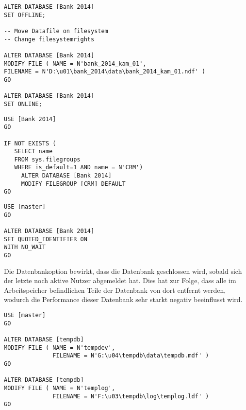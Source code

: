 \begin{enumerate}
\begin{lstlisting}[language=ms_sql, caption={Verschieben einer
      Datendatei}, label=admin_03_loesung_12]
ALTER DATABASE [Bank 2014]
SET OFFLINE;

-- Move Datafile on filesystem
-- Change filesystemrights

ALTER DATABASE [Bank 2014]
MODIFY FILE ( NAME = N'bank_2014_kam_01',
FILENAME = N'D:\u01\bank_2014\data\bank_2014_kam_01.ndf' )
GO

ALTER DATABASE [Bank 2014]
SET ONLINE;     
      \end{lstlisting}

      
      \begin{lstlisting}[language=ms_sql, caption={Ändern der
      Standarddateigruppe}, label=admin_03_loesung_12]
USE [Bank 2014]
GO

IF NOT EXISTS (
   SELECT name 
   FROM sys.filegroups 
   WHERE is_default=1 AND name = N'CRM')
     ALTER DATABASE [Bank 2014]
     MODIFY FILEGROUP [CRM] DEFAULT
GO
      \end{lstlisting}
            
      
      \begin{lstlisting}[language=ms_sql, caption={Die Datenbankoption
      quoted\_identifier ändern}, label=admin_03_loesung_13]
USE [master]
GO

ALTER DATABASE [Bank 2014] 
SET QUOTED_IDENTIFIER ON 
WITH NO_WAIT
GO 
      \end{lstlisting}
      
      
      
      Die Datenbankoption  bewirkt, dass die Datenbank
      geschlossen wird, sobald sich der letzte noch aktive Nutzer abgemeldet
      hat. Dies hat zur Folge, dass alle im Arbeitspeicher befindlichen Teile
      der Datenbank von dort entfernt werden, wodurch die Performance dieser
      Datenbank sehr starkt negativ beeinflusst wird.
      
      
      \begin{lstlisting}[language=ms_sql, caption={Verschieben der
      Systemdatenbank tempdb}, label=admin_03_loesung_14]
USE [master]
GO

ALTER DATABASE [tempdb]
MODIFY FILE ( NAME = N'tempdev',
              FILENAME = N'G:\u04\tempdb\data\tempdb.mdf' )
GO

ALTER DATABASE [tempdb]
MODIFY FILE ( NAME = N'templog',
              FILENAME = N'F:\u03\tempdb\log\templog.ldf' )
GO


\end{lstlisting}
\end{enumerate}
